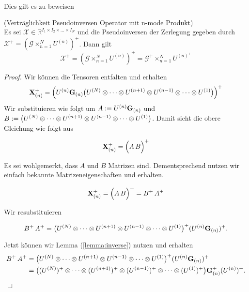 Dies gilt es zu beweisen
\begin{Lemma} (Verträglichkeit Pseudoinversen Operator mit n-mode Produkt) \\
Es sei $\pmb{\mathscr{X}}  \in \mathbb{R}^{I_1 \times I_2 \times \dots \times I_N}$ und die Pseudoinversen der Zerlegung gegeben durch $\pmb{\mathscr{X}}^{+} = (\pmb{\mathscr{G}} \times_{n=1}^{N} U^{ (n) })^+$. Dann gilt
\begin{equation}
\pmb{\mathscr{X}}^{+} = (\pmb{\mathscr{G}} \times_{n=1}^{N} U^{ (n) })^+  = \pmb{\mathscr{G}}^{+} \times_{n=1}^{N} U^{ (n) ^{+} }
\end{equation} 
\begin{proof}
Wir können die Tensoren entfalten und erhalten 
\begin{equation}
\bold{X}_{(n)}^{+} = \Big{(} U^{(n)} \bold{G}_{(n)} \big{(} U^{(N)} \otimes \dots \otimes U^{(n+1)} \otimes U^{(n-1)} \otimes \dots \otimes U^{(1)} \big{)} \Big{)}^+  
\end{equation}
Wir substituieren wie folgt um $A:=U^{(n)}\bold{G}_{(n)}$ und $B:=\big{(} U^{(N)} \otimes \dots \otimes U^{(n+1)} \otimes U^{(n-1)} \otimes \dots \otimes U^{(1)} \big{)}$. Damit sieht die obere Gleichung wie folgt aus

\begin{equation}
\bold{X}_{(n)}^{+} = \Big{(} A \, B \Big{)}^+  
\end{equation}

Es sei wohlgemerkt, dass $A$ und $B$ Matrizen sind. Dementsprechend nutzen wir einfach bekannte Matrizeneigenschaften und erhalten.

\begin{equation}
\bold{X}_{(n)}^{+} = \Big{(} A \, B \Big{)}^+   = B^+ \, A^+
\end{equation}


Wir resubstituieren

\begin{equation}
B^+ \, A^+ = \big{(} U^{(N)} \otimes \dots \otimes U^{(n+1)} \otimes U^{(n-1)} \otimes \dots \otimes U^{(1)} \big{)}^+ (U^{(n)}\bold{G}_{(n)})^+ .
\end{equation}

Jetzt können wir Lemma (\ref{lemma:inverse}) nutzen und erhalten
\begin{equation}
\begin{aligned}
B^+ \, A^+ &= \big{(} U^{(N)} \otimes \dots \otimes U^{(n+1)} \otimes U^{(n-1)} \otimes \dots \otimes U^{(1)} \big{)}^+ (U^{(n)}\bold{G}_{(n)})^+ \\ &=  
\big{(} (U^{(N)})^+ \otimes \dots \otimes (U^{(n+1)})^+ \otimes (U^{(n-1)})^+ \otimes \dots \otimes (U^{(1)})^+ \big{)}  \bold{G}_{(n)}^+ (U^{(n)})^+ .
\end{aligned}
\end{equation}



\end{proof}
\end{Lemma}

